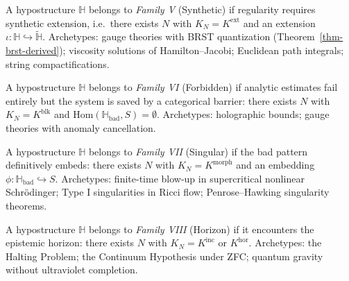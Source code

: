\begin{definition}\label{def-family-synthetic}
A hypostructure $\mathbb H$ belongs to \emph{Family V} (Synthetic) if regularity requires synthetic extension, i.e.\ there exists $N$ with $K_N = K^{\mathrm{ext}}$ and an extension $\iota : \mathbb H \hookrightarrow \tilde{\mathbb H}$. Archetypes: gauge theories with BRST quantization (Theorem~\ref{thm-brst-derived}); viscosity solutions of Hamilton--Jacobi; Euclidean path integrals; string compactifications.
\end{definition}

\begin{definition}\label{def-family-forbidden}
A hypostructure $\mathbb H$ belongs to \emph{Family VI} (Forbidden) if analytic estimates fail entirely but the system is saved by a categorical barrier: there exists $N$ with $K_N = K^{\mathrm{blk}}$ and $\mathrm{Hom}(\mathbb H_{\mathrm{bad}}, S) = \emptyset$. Archetypes: holographic bounds; gauge theories with anomaly cancellation.
\end{definition}

\begin{definition}\label{def-family-singular}
A hypostructure $\mathbb H$ belongs to \emph{Family VII} (Singular) if the bad pattern definitively embeds: there exists $N$ with $K_N = K^{\mathrm{morph}}$ and an embedding $\phi : \mathbb H_{\mathrm{bad}} \hookrightarrow S$. Archetypes: finite-time blow-up in supercritical nonlinear Schr\"odinger; Type I singularities in Ricci flow; Penrose--Hawking singularity theorems.
\end{definition}

\begin{definition}\label{def-family-horizon}
A hypostructure $\mathbb H$ belongs to \emph{Family VIII} (Horizon) if it encounters the epistemic horizon: there exists $N$ with $K_N = K^{\mathrm{inc}}$ or $K^{\mathrm{hor}}$. Archetypes: the Halting Problem; the Continuum Hypothesis under ZFC; quantum gravity without ultraviolet completion.
\end{definition}

